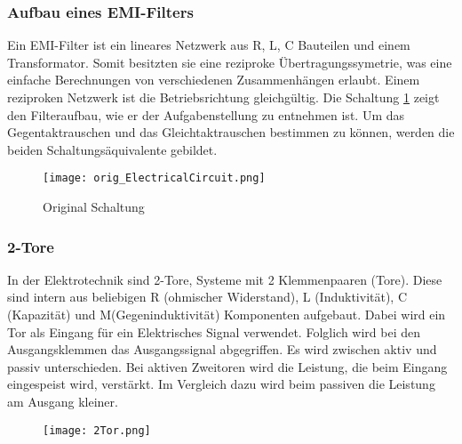 \subsubsection{Aufbau eines EMI-Filters} \label{subsubsec:emi_filter}
Ein EMI-Filter ist ein lineares Netzwerk aus R, L, C Bauteilen und einem Transformator. Somit besitzten sie eine reziproke Übertragungssymetrie, was eine einfache Berechnungen von verschiedenen Zusammenhängen erlaubt. Einem reziproken Netzwerk ist die Betriebsrichtung gleichgültig.
Die Schaltung \ref{fig:orig_Schaltung}  zeigt den Filteraufbau, wie er der Aufgabenstellung zu entnehmen ist. Um das Gegentaktrauschen und das Gleichtaktrauschen bestimmen zu können, werden die beiden Schaltungsäquivalente gebildet. 

\begin{figure}[H]
	\centering
	\texttt{[image: orig\_ElectricalCircuit.png]}
	\caption{Original Schaltung \cite{aufgabenstellung}}
	\label{fig:orig_Schaltung}
\end{figure}


\subsubsection{2-Tore} \label{subsubsec:emi_filter}

In der Elektrotechnik sind 2-Tore, Systeme mit 2 Klemmenpaaren (Tore). 
Diese sind intern aus beliebigen R (ohmischer Widerstand), L (Induktivität), C (Kapazität) und M(Gegeninduktivität) Komponenten aufgebaut. 
Dabei wird ein Tor als Eingang für ein Elektrisches Signal verwendet. Folglich wird bei den Ausgangsklemmen das Ausgangssignal abgegriffen. 
Es wird zwischen aktiv und passiv unterschieden.
Bei aktiven Zweitoren wird die Leistung, die beim Eingang eingespeist wird, verstärkt. 
Im Vergleich dazu wird beim passiven die Leistung am Ausgang kleiner.

\begin{figure}[H]
	\centering
	\texttt{[image: 2Tor.png]}
	\label{fig:übersicht}
\end{figure}